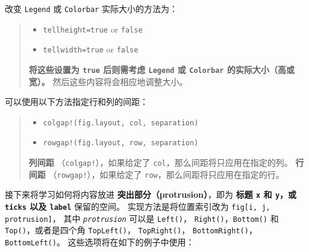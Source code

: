 \documentclass[
  notoc %
]{tufte-book}
\providecommand{\tightlist}{%
  \setlength{\itemsep}{0pt}\setlength{\parskip}{0pt}
}
\newcommand{\passthrough}[1]{#1}
\begin{document}
改变 \passthrough{\lstinline!Legend!} 或
\passthrough{\lstinline!Colorbar!} 实际大小的方法为：

\begin{quote}
\begin{itemize}
\tightlist
\item
  \passthrough{\lstinline!tellheight=true!} or
  \passthrough{\lstinline!false!}
\item
  \passthrough{\lstinline!tellwidth=true!} or
  \passthrough{\lstinline!false!}
\end{itemize}

\textbf{将这些设置为 \passthrough{\lstinline!true!} 后则需考虑
\passthrough{\lstinline!Legend!} 或 \passthrough{\lstinline!Colorbar!}
的实际大小（高或宽）。} 然后这些内容将会相应地调整大小。
\end{quote}

可以使用以下方法指定行和列的间距：

\begin{quote}
\begin{itemize}
\tightlist
\item
  \passthrough{\lstinline"colgap!(fig.layout, col, separation)"}
\item
  \passthrough{\lstinline"rowgap!(fig.layout, row, separation)"}
\end{itemize}

\textbf{列间距} （\passthrough{\lstinline"colgap!"}），如果给定了
\passthrough{\lstinline!col!}，那么间距将只应用在指定的列。
\textbf{行间距} （\passthrough{\lstinline"rowgap!"}），如果给定了
\passthrough{\lstinline!row!}，那么间距将只应用在指定的行。
\end{quote}

接下来将学习如何将内容放进 \textbf{突出部分（protrusion）}，即为
\textbf{标题 \passthrough{\lstinline!x!} 和
\passthrough{\lstinline!y!}，或 \passthrough{\lstinline!ticks!} 以及
\passthrough{\lstinline!label!}} 保留的空间。 实现方法是将位置索引改为
\passthrough{\lstinline!fig[i, j, protrusion]!}， 其中
\emph{\passthrough{\lstinline!protrusion!}} 可以是
\passthrough{\lstinline!Left()!}，
\passthrough{\lstinline!Right()!}，\passthrough{\lstinline!Bottom()!} 和
\passthrough{\lstinline!Top()!}，或者是四个角
\passthrough{\lstinline!TopLeft()!}，
\passthrough{\lstinline!TopRight()!}，
\passthrough{\lstinline!BottomRight()!}，\passthrough{\lstinline!BottomLeft()!}。
这些选项将在如下的例子中使用：
\end{document}
